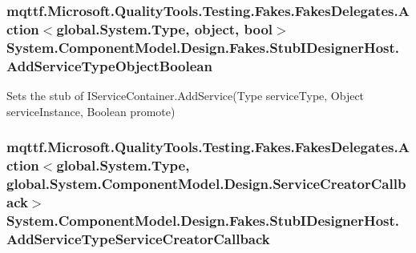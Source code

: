 \hypertarget{class_system_1_1_component_model_1_1_design_1_1_fakes_1_1_stub_i_designer_host_a0a7441ee0c7a376bf8aa80c3a9e5b9b9}{
\subsubsection[{Add\-Service\-Type\-Object\-Boolean}]{\setlength{\rightskip}{0pt plus 5cm}mqttf.\-Microsoft.\-Quality\-Tools.\-Testing.\-Fakes.\-Fakes\-Delegates.\-Action$<$global.\-System.\-Type, object, bool$>$ System.\-Component\-Model.\-Design.\-Fakes.\-Stub\-I\-Designer\-Host.\-Add\-Service\-Type\-Object\-Boolean}}\label{class_system_1_1_component_model_1_1_design_1_1_fakes_1_1_stub_i_designer_host_a0a7441ee0c7a376bf8aa80c3a9e5b9b9}


Sets the stub of I\-Service\-Container.\-Add\-Service(\-Type service\-Type, Object service\-Instance, Boolean promote)

\hypertarget{class_system_1_1_component_model_1_1_design_1_1_fakes_1_1_stub_i_designer_host_a3a11919df2b6d7217ee3c72906cda172}{
\subsubsection[{Add\-Service\-Type\-Service\-Creator\-Callback}]{\setlength{\rightskip}{0pt plus 5cm}mqttf.\-Microsoft.\-Quality\-Tools.\-Testing.\-Fakes.\-Fakes\-Delegates.\-Action$<$global.\-System.\-Type, global.\-System.\-Component\-Model.\-Design.\-Service\-Creator\-Callback$>$ System.\-Component\-Model.\-Design.\-Fakes.\-Stub\-I\-Designer\-Host.\-Add\-Service\-Type\-Service\-Creator\-Callback}}\label{class_system_1_1_component_model_1_1_design_1_1_fakes_1_1_stub_i_designer_host_a3a11919df2b6d7217ee3c72906cda172}


